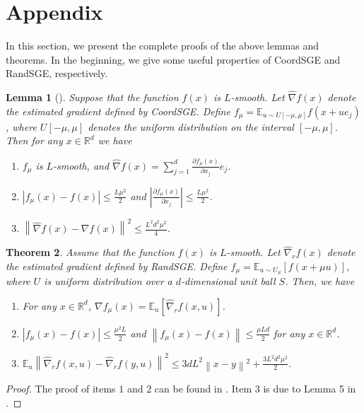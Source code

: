 \documentclass{article}
\newcommand*{\R}{\mathbb{R}}
\newcommand*{\E}{\mathbb{E}}
\newcommand{\norm}[1]{\left\lVert#1\right\rVert}
\newcommand{\abs}[1]{\left|#1\right|}
\newtheorem{theorem}{Theorem}[section]
\newtheorem{lemma}[theorem]{Lemma}
\theoremstyle{definition}
\theoremstyle{remark}
\begin{document}
\section{Appendix}
In this section, we present the complete proofs of the above lemmas and theorems. In the beginning, we give some useful properties of CoordSGE and RandSGE, respectively.
\begin{lemma}[\cite{liu2018zeroth}]\label{CooSGE}
Suppose that the function $f(x)$ is $L$-smooth. Let $\hat{\nabla} f(x)$ denote the estimated gradient defined by CoordSGE. Define $f_{\mu} = \E_{u\sim U[-\mu, \mu]} f(x+ue_j)$, where $U[-\mu,\mu]$ denotes the uniform distribution on the interval $[-\mu, \mu]$. Then for any $x \in \R^d$ we have 
\begin{enumerate}
\item $f_{\mu}$ is $L$-smooth, and 
$\hat{\nabla} f(x) = \sum_{j=1}^d \frac{\partial f_{\mu}(x)}{\partial x_j}e_j$.

\item $\abs{f_{\mu}(x) - f(x)} \leq \frac{L\mu^2}{2}$ and $\abs{\frac{\partial f_{\mu}(x)}{\partial x_j}} \leq \frac{L\mu^2}{2}$.
 
\item $\norm{\hat{\nabla} f(x) - {\nabla} f(x)} ^2 \leq \frac{L^2 d^2 \mu^2}{4}$.
\end{enumerate}  
\end{lemma}
\begin{theorem}\label{SGERand-approx}
Assume that the function $f(x)$ is $L$-smooth. Let $\hat{\nabla}_r f(x)$ denote the estimated gradient defined by RandSGE. Define $f_{\mu} = \E_{u\sim U_S}[f(x+\mu u)]$, where $U$ is uniform distribution over a $d$-dimensional unit ball $S$. Then, we have 
\begin{enumerate}
\item For any $x \in \R^d$, $\nabla f_{\mu}(x) = \E_u[\hat{\nabla}_r f(x,u)]$.\\
\item $\abs{f_{\mu}(x) - f(x)} \leq \frac{\mu^2 L}{2}$ and 
$\norm{f_{\mu}(x) - f(x)} \leq \frac{\mu L d}{2}$ for any $x \in \R^d$.\\
\item $\E_{u}\norm{\hat{\nabla}_r f(x,u) - \hat{\nabla}_r f(y,u)}^2 \leq 3dL^2\norm{x-y}^2 + \frac{3L^2d^2\mu^2}{2}$.
\end{enumerate}
\end{theorem}
\begin{proof}
The proof of items $1$ and $2$ can be found in \cite{gao2018information}. Item 3 is due to Lemma 5 in \cite{ji2019improved}.  
\end{proof}
\end{document}
